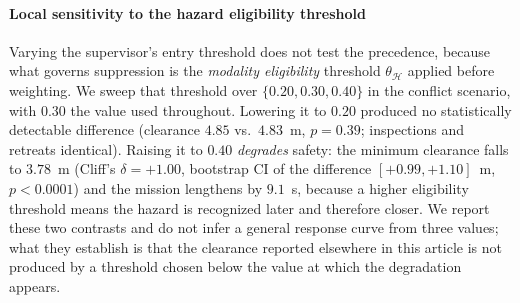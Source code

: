 \paragraph*{Local sensitivity to the hazard eligibility threshold} Varying the supervisor's entry threshold does not test the
precedence, because what governs suppression is the \emph{modality eligibility}
threshold $\theta_{\mathcal{H}}$ applied before weighting. We sweep that threshold
over $\{0.20,0.30,0.40\}$ in the conflict scenario, with $0.30$ the value used
throughout. Lowering it to $0.20$ produced no statistically detectable difference
(clearance $4.85$ vs.\ $4.83$~m, $p=0.39$; inspections and retreats identical). Raising it to $0.40$
\emph{degrades} safety: the minimum clearance falls to $3.78$~m (Cliff's
$\delta=+1.00$, bootstrap CI of the difference $[+0.99,+1.10]$~m, $p<0.0001$) and the
mission lengthens by $9.1$~s, because a higher eligibility threshold means the hazard
is recognized later and therefore closer. We report these two contrasts and do not infer a general response curve from three
values; what they establish is that the clearance reported elsewhere in this article
is not produced by a threshold chosen below the value at which the degradation
appears.

